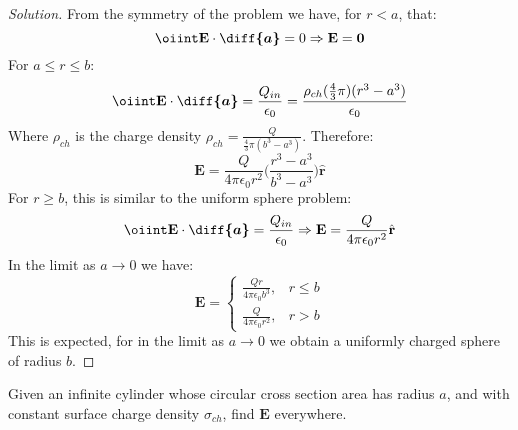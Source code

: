 \documentclass[crop=false,class=article,oneside]{standalone}
\begin{document}
    \begin{proof}[Solution]
        From the symmetry of the problem we have, for $r<a$, that:
        \begin{equation*}
            \oiint\mathbf{E}\cdot\boldsymbol{\diff{a}}
            =0\Rightarrow\mathbf{E}=\mathbf{0}
        \end{equation*}
        For $a\leq{r}\leq{b}$:
        \begin{equation*}
            \oiint\mathbf{E}\cdot\boldsymbol{\diff{a}}
            =\frac{Q_{in}}{\epsilon_{0}}
            =\frac{\rho_{ch}(\frac{4}{3}\pi)(r^{3}-a^{3})}
                  {\epsilon_0}    
        \end{equation*}
        Where $\rho_{ch}$ is the charge density
        $\rho_{ch}=\frac{Q}{\frac{4}{3}\pi(b^{3}-a^{3})}$.
        Therefore:
        \begin{equation*}
            \mathbf{E}
            =\frac{Q}{4\pi\epsilon_{0}r^{2}}
            \bigg(\frac{r^{3}-a^{3}}{b^{3}-a^{3}}\bigg)
            \hat{\mathbf{r}}
        \end{equation*}
        For $r\geq b$, this is similar to
        the uniform sphere problem:
        \begin{equation*}
            \oiint\mathbf{E}\cdot\boldsymbol{\diff{a}}
            =\frac{Q_{in}}{\epsilon_{0}}
            \Rightarrow\mathbf{E}
            =\frac{Q}{4\pi\epsilon_{0}r^{2}}\hat{\mathbf{r}}
        \end{equation*}
        In the limit as $a\rightarrow{0}$ we have:
        \begin{equation*}
            \mathbf{E}=
            \begin{cases}
                \frac{Qr}{4\pi\epsilon_{0}b^{3}},&r\leq b\\
                \frac{Q}{4\pi\epsilon_{0}r^{2}},&r>b
            \end{cases}
        \end{equation*}
        This is expected, for in the limit as
        $a\rightarrow 0$ we obtain a uniformly
        charged sphere of radius $b$.
    \end{proof}
    \begin{problem}[Wangsness 4-7]
        Given an infinite cylinder whose circular
        cross section area has radius $a$, and with
        constant surface charge density $\sigma_{ch}$,
        find $\mathbf{E}$ everywhere.
    \end{problem}
\end{document}
